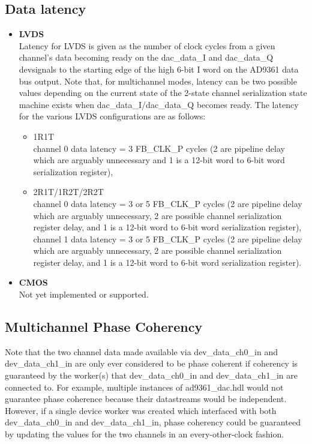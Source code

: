 \documentclass{article}
\begin{document}
\subsection*{Data latency}
\begin{itemize}
\item{\textbf{LVDS}} \\ Latency for LVDS is given as the number of clock cycles from a given channel's data becoming ready on the dac\_data\_I and dac\_data\_Q devsignals to the starting edge of the high 6-bit I word on the AD9361 data bus output. Note that, for multichannel modes, latency can be two possible values depending on the current state of the 2-state channel serialization state machine exists when dac\_data\_I/dac\_data\_Q becomes ready. The latency for the various LVDS configurations are as follows:
\begin{itemize}
	\item{1R1T} \\channel 0 data latency = 3 FB\_CLK\_P cycles (2 are pipeline delay which are arguably unnecessary and 1 is a 12-bit word to 6-bit word serialization register),
	\item{2R1T/1R2T/2R2T} \\channel 0 data latency = 3 or 5 FB\_CLK\_P cycles (2 are pipeline delay which are arguably unnecessary, 2 are possible channel serialization register delay, and 1 is a 12-bit word to 6-bit word serialization register), \\channel 1 data latency = 3 or 5 FB\_CLK\_P cycles (2 are pipeline delay which are arguably unnecessary, 2 are possible channel serialization register delay, and 1 is a 12-bit word to 6-bit word serialization register).
\end{itemize}
\item{\textbf{CMOS}} \\ Not yet implemented or supported.
\end{itemize}
\pagebreak
\subsection*{Multichannel Phase Coherency}
Note that the two channel data made available via dev\_data\_ch0\_in and dev\_data\_ch1\_in are only ever considered to be phase coherent if coherency is guaranteed by the worker(s) that dev\_data\_ch0\_in and dev\_data\_ch1\_in are connected to. For example, multiple instances of ad9361\_dac.hdl would not guarantee phase coherence because their datastreams would be independent. However, if a single device worker was created which interfaced with both dev\_data\_ch0\_in and dev\_data\_ch1\_in, phase coherency could be guaranteed by updating the values for the two channels in an every-other-clock fashion.
\end{document}

